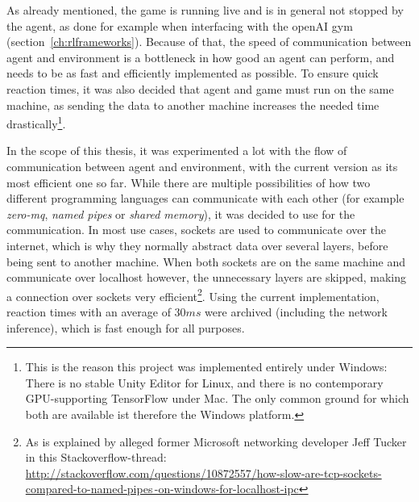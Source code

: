 As already mentioned, the game is running live and is in general not stopped by the agent, as done for example when interfacing with the openAI gym (section~\ref{ch:rlframeworks}). Because of that, the speed of communication between agent and environment is a bottleneck in how good an agent can perform, and needs to be as fast and efficiently implemented as possible. To ensure quick reaction times, it was also decided that agent and game must run on the same machine, as sending the data to another machine increases the needed time drastically\footnote{This is the reason this project was implemented entirely under Windows: There is no stable Unity Editor for Linux, and there is no contemporary GPU-supporting TensorFlow under Mac. The only common ground for which both are available ist therefore the Windows platform.}.

In the scope of this thesis, it was experimented a lot with the flow of communication between agent and environment, with the current version as its most efficient one so far. While there are multiple possibilities of how two different programming languages can communicate with each other (for example \textit{zero-mq}, \textit{named pipes} or \textit{shared memory}), it was decided to use  for the communication. In most use cases, sockets are used to communicate over the internet, which is why they normally abstract data over several layers, before being sent to another machine. When both sockets are on the same machine and communicate over localhost however, the unnecessary layers are skipped, making a connection over sockets very efficient\footnote{As is explained by alleged former Microsoft networking developer Jeff Tucker in this Stackoverflow-thread: \href{http://stackoverflow.com/questions/10872557/how-slow-are-tcp-sockets-compared-to-named-pipes-on-windows-for-localhost-ipc}{http://stackoverflow.com/questions/10872557/how-slow-are-tcp-sockets-compared-to-named-pipes\,-on-windows-for-localhost-ipc}}. Using the current implementation, reaction times with an average of $30ms$ were archived (including the network inference), which is fast enough for all purposes.

